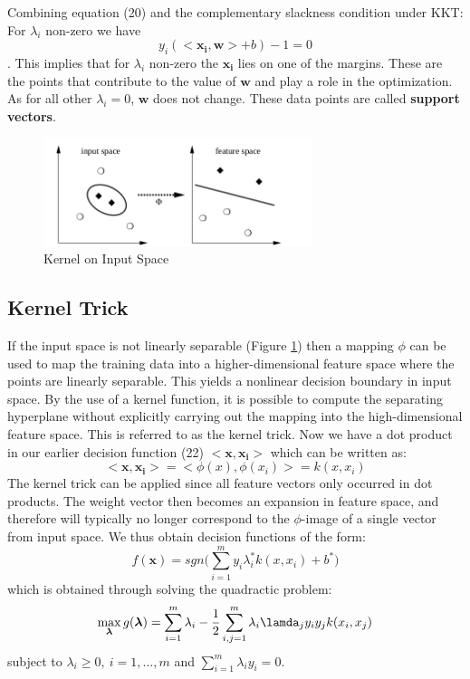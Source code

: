 \documentclass{article}
\begin{document}
Combining equation (20) and the complementary slackness condition under KKT:\\
For $\lambda_i$ non-zero we have \begin{equation*}
    y_i(<\bm{x_i} , \bm{w}> + b) -1 = 0
\end{equation*}. This implies that for $\lambda_i$ non-zero the $\bm{x_i}$ lies on one of the margins. These are the points that contribute to the value of $\bm{w}$ and play a role in the optimization. As for all other $\lambda_i = 0$, $\bm{w}$ does not change. These data points are called \textbf{support vectors}.


\begin{figure}
  \centering
  \includegraphics[width=0.7\textwidth]{kernel.png}
  \caption{Kernel on Input Space}
  \label{fig:fig4}
\end{figure}

\subsection{Kernel Trick}
If the input space is not linearly separable (Figure \ref{fig:fig4}) then a mapping $\phi$ can be used to map the training data into a higher-dimensional feature space where the points are linearly separable. This yields a nonlinear decision boundary in input space. By the use of a kernel function, it is possible to compute the separating hyperplane without explicitly carrying out the mapping into the high-dimensional feature space. This is referred to as the kernel trick.
Now we have a dot product in our earlier decision function (22) $<\bm{x},\bm{x_i}>$ which can be written as:
\begin{equation}
<\bm{x},\bm{x_i}> = <\phi(x),\phi(x_i)> = k(x,x_i)
\end{equation}
The kernel trick can be applied since all feature vectors only occurred in dot products. The weight vector then becomes an expansion in feature space, and therefore will typically no longer correspond to the $\phi$-image of a single vector from input space. We thus obtain decision functions of the form:
\begin{equation}
    f(\bm{x}) = sgn \Big( \sum_{i=1}^{m}{y_i\lambda_i^*k(x,x_i)} + b^* \big)
\end{equation} which is obtained through solving the quadractic problem:
\begin{equation}
\max_{\bm{\lambda}} g(\bm{\lambda}) = \sum_{i=1}^m{\lambda_i} - \frac{1}{2} \sum_{i,j=1}^{m}{\lambda_i\lamda_jy_iy_jk(x_i,x_j)}
\end{equation}subject to $\lambda_i \geq 0, \ i = 1,...,m$ and $\sum_{i=1}^{m}{\lambda_iy_i} =0$.
\end{document}
